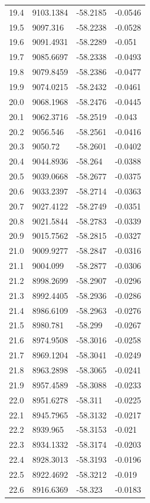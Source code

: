 \begin{table}[H]
\begin{tabular}{llll}
19.4 & 9103.1384 & -58.2185 & -0.0546 \\
19.5 & 9097.316 & -58.2238 & -0.0528 \\
19.6 & 9091.4931 & -58.2289 & -0.051 \\
19.7 & 9085.6697 & -58.2338 & -0.0493 \\
19.8 & 9079.8459 & -58.2386 & -0.0477 \\
19.9 & 9074.0215 & -58.2432 & -0.0461 \\
20.0 & 9068.1968 & -58.2476 & -0.0445 \\
20.1 & 9062.3716 & -58.2519 & -0.043 \\
20.2 & 9056.546 & -58.2561 & -0.0416 \\
20.3 & 9050.72 & -58.2601 & -0.0402 \\
20.4 & 9044.8936 & -58.264 & -0.0388 \\
20.5 & 9039.0668 & -58.2677 & -0.0375 \\
20.6 & 9033.2397 & -58.2714 & -0.0363 \\
20.7 & 9027.4122 & -58.2749 & -0.0351 \\
20.8 & 9021.5844 & -58.2783 & -0.0339 \\
20.9 & 9015.7562 & -58.2815 & -0.0327 \\
21.0 & 9009.9277 & -58.2847 & -0.0316 \\
21.1 & 9004.099 & -58.2877 & -0.0306 \\
21.2 & 8998.2699 & -58.2907 & -0.0296 \\
21.3 & 8992.4405 & -58.2936 & -0.0286 \\
21.4 & 8986.6109 & -58.2963 & -0.0276 \\
21.5 & 8980.781 & -58.299 & -0.0267 \\
21.6 & 8974.9508 & -58.3016 & -0.0258 \\
21.7 & 8969.1204 & -58.3041 & -0.0249 \\
21.8 & 8963.2898 & -58.3065 & -0.0241 \\
21.9 & 8957.4589 & -58.3088 & -0.0233 \\
22.0 & 8951.6278 & -58.311 & -0.0225 \\
22.1 & 8945.7965 & -58.3132 & -0.0217 \\
22.2 & 8939.965 & -58.3153 & -0.021 \\
22.3 & 8934.1332 & -58.3174 & -0.0203 \\
22.4 & 8928.3013 & -58.3193 & -0.0196 \\
22.5 & 8922.4692 & -58.3212 & -0.019 \\
22.6 & 8916.6369 & -58.323 & -0.0183 \\

\end{tabular}
\end{table}
